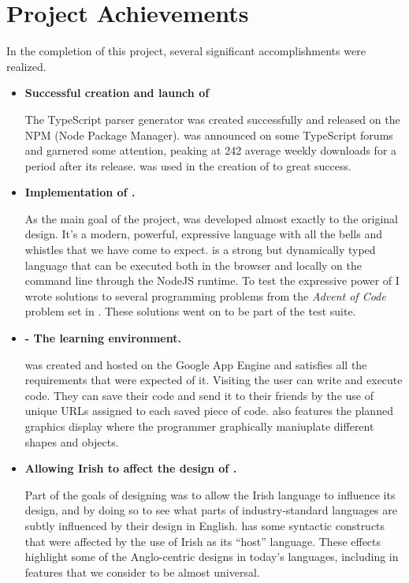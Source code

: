 \section{Project Achievements}
In the completion of this project, several significant accomplishments were realized.
\begin{itemize}
    \item \textbf{Successful creation and launch of \tsPEG{}}

        The TypeScript parser generator \tsPEG{} was created successfully and released on the NPM (Node Package Manager). \tsPEG{} was announced on some TypeScript forums and garnered some attention, peaking at 242 average weekly downloads for a period after its release. \tsPEG{} was used in the creation of \Setanta{} to great success.

    \item \textbf{Implementation of \Setanta{}.}

        As the main goal of the project, \Setanta{} was developed almost exactly to the original design. It's a modern, powerful, expressive language with all the bells and whistles that we have come to expect. \Setanta{} is a strong but dynamically typed language that can be executed both in the browser and locally on the command line through the NodeJS runtime. To test the expressive power of \Setanta{} I wrote solutions to several programming problems from the \emph{Advent of Code} problem set in \Setanta{}. These solutions went on to be part of the test suite.

    \item \textbf{\trys{} - The \Setanta{} learning environment.}

        \trys{} was created and hosted on the Google App Engine and satisfies all the requirements that were expected of it. Visiting \trys{} the user can write and execute \Setanta{} code. They can save their code and send it to their friends by the use of unique URLs assigned to each saved piece of code. \trys{} also features the planned graphics display where the programmer graphically maniuplate different shapes and objects.

    \item \textbf{Allowing Irish to affect the design of \Setanta{}.}

        Part of the goals of designing \Setanta{} was to allow the Irish language to influence its design, and by doing so to see what parts of industry-standard languages are subtly influenced by their design in English. \Setanta{} has some syntactic constructs that were affected by the use of Irish as its ``host'' language. These effects highlight some of the Anglo-centric designs in today's languages, including in features that we consider to be almost universal.


\end{itemize}
